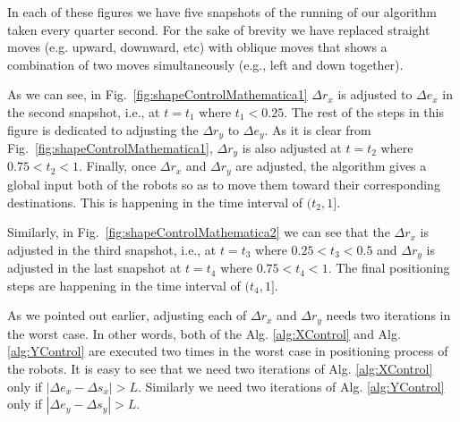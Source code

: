 In each of these figures we have five snapshots of the running of our algorithm taken every quarter second. For the sake of brevity we have replaced straight moves (e.g. upward, downward, etc) with oblique moves that shows a combination of two moves simultaneously (e.g., left and down together). 

As we can see, in Fig.~\ref{fig:shapeControlMathematica1} $\Delta r_x$ is adjusted to $\Delta e_x$ in the second snapshot, i.e., at $t = t_1$ where $t_1<0.25$. The rest of the steps in this figure is dedicated to adjusting the $\Delta r_y$ to $\Delta e_y$. As it is clear from Fig.~\ref{fig:shapeControlMathematica1}, $\Delta r_y$ is also adjusted at $t = t_2$ where $0.75<t_2<1$. Finally, once $\Delta r_x$ and $\Delta r_y$ are adjusted, the algorithm gives a global input both of the robots so as to move them toward their corresponding destinations. This is happening in the time interval of $(t_2,1]$.

Similarly, in Fig.~\ref{fig:shapeControlMathematica2} we can see that the $\Delta r_x$ is adjusted in the third snapshot, i.e., at $t=t_3$ where $0.25<t_3<0.5$ and $\Delta r_y$ is adjusted in the last snapshot at $t=t_4$ where $0.75<t_4<1$. The final positioning steps are happening in the time interval of $(t_4,1]$.

As we pointed out earlier, adjusting each of $\Delta r_x$ and $\Delta r_y$ needs two iterations in the worst case. In other words, both of the Alg. \ref{alg:XControl} and Alg. \ref{alg:YControl} are executed two times in the worst case in positioning process of the robots. It is easy to see that we need two iterations of Alg. \ref{alg:XControl} only if $|\Delta e_x - \Delta s_x|>L$. Similarly we need two iterations of Alg. \ref{alg:YControl} only if $|\Delta e_y - \Delta s_y|>L$.








